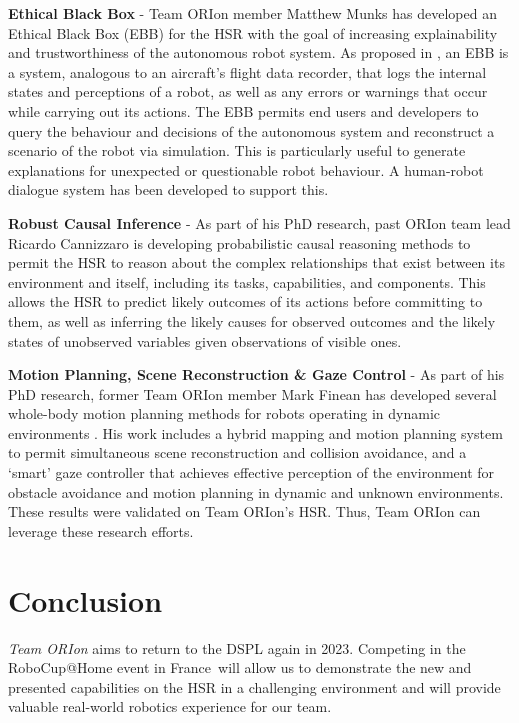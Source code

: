\documentclass[runningheads,a4paper]{llncs}
\newcommand{\robospecs}{%
  \newpage%
  \pagenumbering{gobble}%
}
\newcommand{\teamori}{Team ORIon}
\newcommand{\competitionyear}{2023}
\newcommand{\competitioncountry}{France}
\begin{document}
\textbf{Ethical Black Box} - \teamori{} member Matthew Munks has developed an Ethical Black Box (EBB) for the HSR with the goal of increasing explainability and trustworthiness of the autonomous robot system. As proposed in \cite{winfield2017}, an EBB is a system, analogous to an aircraft's flight data recorder, that logs the internal states and perceptions of a robot, as well as any errors or warnings that occur while carrying out its actions. The EBB permits end users and developers to query the behaviour and decisions of the autonomous system and reconstruct a scenario of the robot via simulation. This is particularly useful to generate explanations for unexpected or questionable robot behaviour. A human-robot dialogue system has been developed to support this.

\textbf{Robust Causal Inference} - As part of his PhD research, past ORIon team lead Ricardo Cannizzaro is developing probabilistic causal reasoning methods to permit the HSR to reason about the complex relationships that exist between its environment and itself, including its tasks, capabilities, and components. This allows the HSR to predict likely outcomes of its actions before committing to them, as well as inferring the likely causes for observed outcomes and the likely states of unobserved variables given observations of visible ones.

\textbf{Motion Planning, Scene Reconstruction \& Gaze Control} - As part of his PhD research, former \teamori{} member Mark Finean has developed several whole-body motion planning methods for robots operating in dynamic environments \cite{finean2021simultaneous,finean2021i}. His work includes a hybrid mapping and motion planning system to permit simultaneous scene reconstruction and collision avoidance, and a `smart' gaze controller that achieves effective perception of the environment for obstacle avoidance and motion planning in dynamic and unknown environments. These results were validated on \teamori{}'s HSR. Thus, \teamori{} can leverage these research efforts.

\section{Conclusion}

 \textit{\teamori{}} aims to return to the DSPL again in \competitionyear. 
Competing in the RoboCup@Home event in \competitioncountry\ will allow us to demonstrate the new and presented capabilities on the HSR in a challenging environment and will provide valuable real-world robotics experience for our team.




\clearpage
\robospecs

\end{document}
